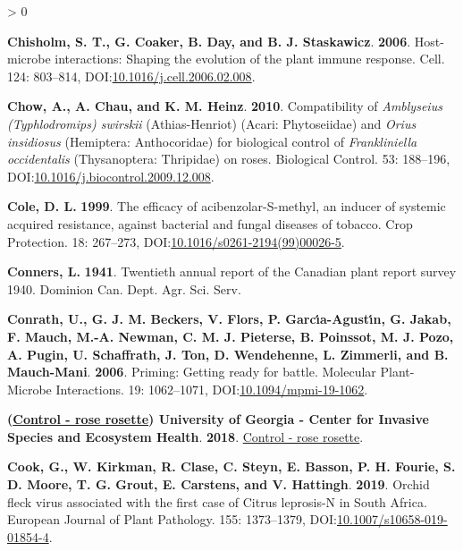 \documentclass{ufdissertation}[overrideChapters] %
\newlength{\cslhangindent}
\newenvironment{CSLReferences}[2] %
 {%
  \setlength{\parindent}{0pt}
  \ifodd #1 \everypar{\setlength{\hangindent}{\cslhangindent}}\ignorespaces\fi
  \ifnum #2 > 0
  \setlength{\parskip}{#2\baselineskip}
  \fi
 }%
 {}
\begin{document}
{\begin{CSLReferences}{1}{1}
\leavevmode{}%
\textbf{Chisholm, S. T., G. Coaker, B. Day, and B. J. Staskawicz}. \textbf{2006}. Host-microbe interactions: Shaping the evolution of the plant immune response. Cell. 124: 803--814, DOI:\href{https://doi.org/10.1016/j.cell.2006.02.008}{10.1016/j.cell.2006.02.008}.

\leavevmode{}%
\textbf{Chow, A., A. Chau, and K. M. Heinz}. \textbf{2010}. Compatibility of {\emph{Amblyseius (Typhlodromips) swirskii}} ({Athias-Henriot}) ({Acari: Phytoseiidae}) and {\emph{Orius insidiosus}} ({Hemiptera}: {Anthocoridae}) for biological control of {\emph{Frankliniella occidentalis}} ({Thysanoptera:} {Thripidae}) on roses. Biological Control. 53: 188--196, DOI:\href{https://doi.org/10.1016/j.biocontrol.2009.12.008}{10.1016/j.biocontrol.2009.12.008}.

\leavevmode{}%
\textbf{Cole, D. L.} \textbf{1999}. The efficacy of acibenzolar-{S}-methyl, an inducer of systemic acquired resistance, against bacterial and fungal diseases of tobacco. Crop Protection. 18: 267--273, DOI:\href{https://doi.org/10.1016/s0261-2194(99)00026-5}{10.1016/s0261-2194(99)00026-5}.

\leavevmode{}%
\textbf{Conners, L.} \textbf{1941}. Twentieth annual report of the {Canadian} plant report survey 1940. Dominion Can. Dept. Agr. Sci. Serv.

\leavevmode{}%
\textbf{Conrath, U., G. J. M. Beckers, V. Flors, P. Garcı́a-Agustı́n, G. Jakab, F. Mauch, M.-A. Newman, C. M. J. Pieterse, B. Poinssot, M. J. Pozo, A. Pugin, U. Schaffrath, J. Ton, D. Wendehenne, L. Zimmerli, and B. Mauch-Mani}. \textbf{2006}. Priming: Getting ready for battle. Molecular Plant-Microbe Interactions{\textregistered}. 19: 1062--1071, DOI:\href{https://doi.org/10.1094/mpmi-19-1062}{10.1094/mpmi-19-1062}.

\leavevmode{}%
\textbf{(\href{https://roserosette.org/control/}{Control - rose rosette}) University of Georgia - Center for Invasive Species and Ecosystem Health}. \textbf{2018}. \href{https://roserosette.org/control/}{Control - rose rosette}.

\leavevmode{}%
\textbf{Cook, G., W. Kirkman, R. Clase, C. Steyn, E. Basson, P. H. Fourie, S. D. Moore, T. G. Grout, E. Carstens, and V. Hattingh}. \textbf{2019}. {Orchid fleck virus} associated with the first case of {Citrus leprosis}-{N} in {South Africa}. European Journal of Plant Pathology. 155: 1373--1379, DOI:\href{https://doi.org/10.1007/s10658-019-01854-4}{10.1007/s10658-019-01854-4}.


\end{CSLReferences}}
\end{document}
